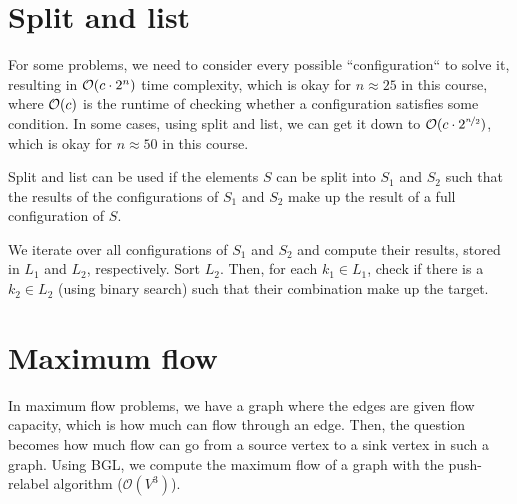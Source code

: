 \documentclass[justified,nobib]{tufte-handout}
\begin{document}
\section{Split and list}


For some problems, we need to consider every possible ``configuration`` to solve it, resulting in
$\bigo{c \cdot 2^n}$ time complexity, which is okay for $n \approx 25$ in this course, where
$\bigo{c}$ is the runtime of checking whether a configuration satisfies some condition. In some
cases, using split and list, we can get it down to $\mathcal{O}(c \cdot 2^{\nicefrac{n}{2}})$,
which is okay for $n \approx 50$ in this course.

Split and list can be used if the elements $S$ can be split into $S_1$ and $S_2$ such that the
results of the configurations of $S_1$ and $S_2$ make up the result of a full configuration of $S$.

We iterate over all configurations of $S_1$ and $S_2$ and compute their results, stored in $L_1$
and $L_2$, respectively. Sort $L_2$. Then, for each $k_1\in L_1$, check if there is a $k_2 \in L_2$
(using binary search) such that their combination make up the target.

\section{Maximum flow}


In maximum flow problems, we have a graph where the edges are given flow capacity, which is how
much can flow through an edge. Then, the question becomes how much flow can go from a source vertex
to a sink vertex in such a graph. Using BGL, we compute the maximum flow of a graph with the
push-relabel algorithm ($\mathcal{O}(V^3)$).
\end{document}
